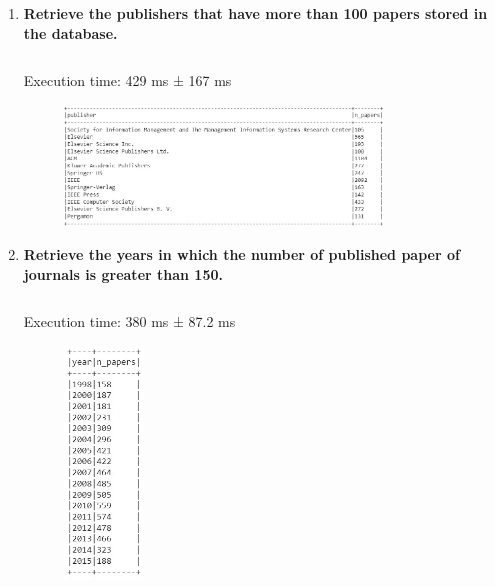 \documentclass{Configuration_Files/PoliMi3i_thesis}
\begin{document}
\begin{enumerate}
    \item \textbf{Retrieve the publishers that have more than 100 papers stored in the database.}
    \inputminted[linenos,tabsize=2,breaklines]{Python}{code/queries_spark/query_6.txt}
    Execution time: 429 ms ± 167 ms
    \begin{figure}[H]
        \centering
         \includegraphics[width=0.8\textwidth]{Images/queries_spark/query_6.jpg}
    \end{figure} 
    
    \item \textbf{Retrieve the years in which the number of published paper of journals is greater than 150.}
    \inputminted[linenos,tabsize=2,breaklines]{Python}{code/queries_spark/query_7.txt}
    Execution time: 380 ms ± 87.2 ms
    \begin{figure}[H]
        \centering
         \includegraphics[width=0.2\textwidth]{Images/queries_spark/query_7.jpg}
    \end{figure}  
    

\end{enumerate}
\end{document}
